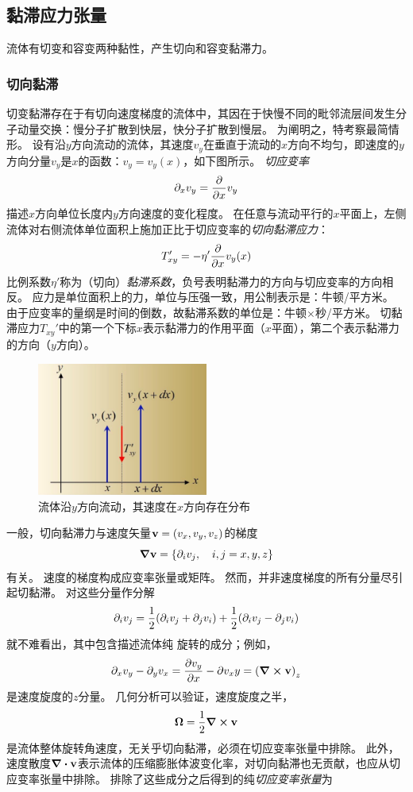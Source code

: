 \documentclass[UTF8]{ctexbook}
\begin{document}
\subsection{黏滞应力张量}

流体有切变和容变两种黏性，产生切向和容变黏滞力。

\subsubsection{切向黏滞}
切变黏滞存在于有切向速度梯度的流体中，其因在于快慢不同的毗邻流层间发生分子动量交换：慢分子扩散到快层，快分子扩散到慢层。
为阐明之，特考察最简情形。
设有沿$y$方向流动的流体，其速度$v_y$在垂直于流动的$x$方向不均匀，即速度的$y$方向分量$v_y$是$x$的函数：$v_y=v_y(x)$，如下图所示。
\emph{切应变率}
$$\partial_x v_y = \pdv{x} v_y$$
 描述$x$方向单位长度内$y$方向速度的变化程度。
 在任意与流动平行的$x$平面上，左侧流体对右侧流体单位面积上施加正比于切应变率的\emph{切向黏滞应力}：
 $$T_{xy}' = - \eta' \pdv{x} v_y(x)$$
  比例系数$\eta'$称为（切向）\emph{黏滞系数}，负号表明黏滞力的方向与切应变率的方向相反。
  应力是单位面积上的力，单位与压强一致，用公制表示是：牛顿/平方米。
  由于应变率的量纲是时间的倒数，故黏滞系数的单位是：牛顿$\times$秒/平方米。
  切黏滞应力$T_{xy}'$中的第一个下标$x$表示黏滞力的作用平面（$x$平面），第二个表示黏滞力的方向（$y$方向）。

\begin{figure}[h]
	\centering
	\includegraphics[width=0.5\textwidth]{img/absorption/viscosity_sketch.jpg}
	\caption{流体沿$y$方向流动，其速度在$x$方向存在分布}
	\label{fig:viscosity_sketch}
\end{figure}

 一般，切向黏滞力与速度矢量$\vb{v}=(v_x,v_y,v_z)$的梯度
 $$\grad \vb{v} =\qty{\partial_i v_j\qc i,j = x,y,z}$$
 有关。
 速度的梯度构成应变率张量或矩阵。
 然而，并非速度梯度的所有分量尽引起切黏滞。
 对这些分量作分解
 $$\partial_i v_j = \frac{1}{2}\qty(\partial_i v_j + \partial_j v_i) + \frac12 (\partial_i v_j-\partial_j v_i)$$
  就不难看出，其中包含描述流体纯 旋转的成分；例如，
  $$\partial_x v_y - \partial_y v_x = \pdv{v_y}{x} - \partial{v_x}{y} = \qty(\curl \vb{v})_z$$
  是速度旋度的$z$分量。
  几何分析可以验证，速度旋度之半，
  $$\bm{\Omega} = \frac12 \curl \vb{v}$$
  是流体整体旋转角速度，无关乎切向黏滞，必须在切应变率张量中排除。
  此外，速度散度$\div \vb{v}$表示流体的压缩膨胀体波变化率，对切向黏滞也无贡献，也应从切应变率张量中排除。
  排除了这些成分之后得到的纯\emph{切应变率张量}为
\end{document}
